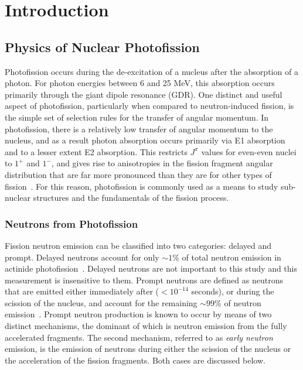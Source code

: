 \chapter{Introduction}
\section{Physics of Nuclear Photofission}
Photofission occurs during the de-excitation of a nucleus after the absorption of a photon.
For photon energies between 6 and 25 MeV, this absorption occurs primarily through the giant dipole resonance (GDR).
One distinct and useful aspect of photofission, particularly when compared to neutron-induced fission, is the simple set of selection rules for the transfer of angular momentum.
In photofission, there is a relatively low transfer of angular momentum to the nucleus, and as a result photon absorption occurs primarily via E1 absorption and to a lesser extent E2 absorption.
This restricts $J^{\pi}$ values for even-even nuclei to $1^{+}$ and $1^{-}$, and gives rise to anisotropies in the fission fragment angular distribution that are far more pronounced than they are for other types of fission~\cite{1977FragAss}.
For this reason, photofission is commonly used as a means to study sub-nuclear structures and the fundamentals of the fission process.

\subsection{Neutrons from Photofission}
Fission neutron emission can be classified into two categories: delayed and prompt.
Delayed neutrons account for only $\sim1\%$ of total neutron emission in actinide photofission~\cite{Caldwell2017DelayedNs}.
Delayed neutrons are not important to this study and this measurement is insensitive to them.
Prompt neutrons are defined as neutrons that are emitted either immediately after ($<10^{-14}$ seconds), or during the scission of the nucleus, and account for the remaining $\sim99\%$ of neutron emission~\cite{Caldwell2017DelayedNs}.
Prompt neutron production is known to occur by means of two distinct mechanisms, the dominant of which is neutron emission from the fully accelerated fragments.
The second mechanism, referred to as \textit{early neutron} emission, is the emission of neutrons during either the scission of the nucleus or the acceleration of the fission fragments.
Both cases are discussed below.

